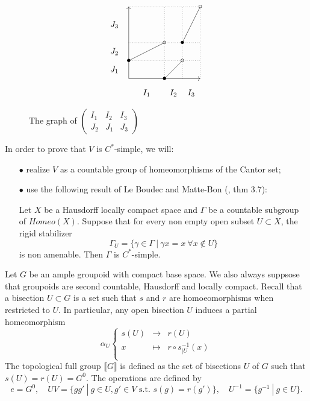 \begin{figure}
\centering
\[\begin{tikzpicture}[scale=3] 

\draw[->] (0,0) -- (0,1);
\draw[->] (0,0) -- (1,0);
\draw[dotted] (1,0) -- (1,1);
\draw[dotted] (0,1) -- (1,1);

\draw (0,0.25) -- (0.5,0.5);
\draw (0.5, 0) -- (0.75,0.25);
\draw (0.75,0.5) -- (1,1);

\draw[dotted] (0.5,0) -- (0.5,1);
\draw[dotted] (0.75,0) -- (0.75,1);
\draw[dotted] (0,0.25) -- (1,0.25);
\draw[dotted] (0,0.5) -- (1,0.5);

\draw (0,0.25) node {$\bullet$}; \draw (0.5,0.5) node {$\circ$};
\draw (0.5,0)  node {$\bullet$}; \draw (0.75,0.25) node {$\circ$};
\draw (0.75,0.5) node {$\bullet$}; \draw (1,1) node {$\circ$};

\draw (0.25,-0.2) node {$I_1$};
\draw (0.625,-0.2) node {$I_2$};
\draw (0.875,-0.2) node {$I_3$};
\draw (-0.2,0.125) node {$J_1$};
\draw (-0.2,0.375) node {$J_2$};
\draw (-0.2, 0.75) node {$J_3$};
\end{tikzpicture} \] 
\caption[]{The graph of $\begin{pmatrix} I_1 & I_2 & I_3 \\ J_2 & J_1 & J_3\end{pmatrix}$}
\end{figure}

In order to prove that $V$ is $C^*$-simple, we will:
\begin{itemize}
\item[$\bullet$] realize $V$ as a countable group of homeomorphisms of the Cantor set;
\item[$\bullet$] use the following result of Le Boudec and Matte-Bon (\cite{Boudec2016subgroup}, thm 3.7):
\begin{thm}
Let $X$ be a Hausdorff locally compact space and $\Gamma$ be a countable subgroup of $Homeo(X)$. Suppose that for every non empty open subset $U\subset X$, the rigid stabilizer
\[\Gamma_U = \{\gamma \in \Gamma \ |\  \gamma x = x \ \forall x\notin U\}\]
is non amenable. Then $\Gamma$ is $C^*$-simple.
\end{thm}
\end{itemize}

Let $G$ be an ample groupoid with compact base space. We also always suppsose that groupoids are second countable, Hausdorff and locally compact. Recall that a bisection $U\subset G$ is a set such that $s$ and $r$ are homoeomorphisms when restricted to $U$. In particular, any open bisection $U$ induces a partial homeomorphism
\[\alpha_U \left\{ \begin{array}{rcl}
s(U) & \rightarrow & r(U)\\ x & \mapsto & r\circ s_{|U}^{-1}(x)\\
 \end{array}\right.\] 
The topological full group $\llbracket  G \rrbracket$ is defined as the set of bisections $U$ of $G$ such that $s(U)=r(U)= G^0$. The operations are defined by 
\[e = G^0, \quad UV = \{gg' \ | \ g\in U , g'\in V  \text{ s.t. } s(g)=r(g')\}, \quad U^{-1}= \{g^{-1} \ | \ g\in U\}.\]

